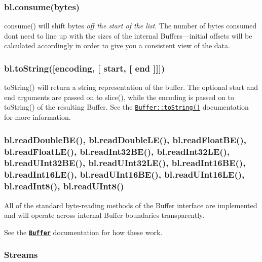  \label{_consume}%
 \subsubsection*{bl.\+consume(bytes)}

{\ttfamily consume()} will shift bytes {\itshape off the start of the list}. The number of bytes consumed don\textquotesingle{}t need to line up with the sizes of the internal Buffers---initial offsets will be calculated accordingly in order to give you a consistent view of the data. 

 \label{_toString}%
 \subsubsection*{bl.\+to\+String(\mbox{[}encoding, \mbox{[} start, \mbox{[} end \mbox{]}\mbox{]}\mbox{]})}

{\ttfamily to\+String()} will return a string representation of the buffer. The optional {\ttfamily start} and {\ttfamily end} arguments are passed on to {\ttfamily slice()}, while the {\ttfamily encoding} is passed on to {\ttfamily to\+String()} of the resulting Buffer. See the \href{http://nodejs.org/docs/latest/api/buffer.html#buffer_buf_tostring_encoding_start_end}{\tt Buffer\+::to\+String()} documentation for more information. 

 \label{_readXX}%
 \subsubsection*{bl.\+read\+Double\+B\+E(), bl.\+read\+Double\+L\+E(), bl.\+read\+Float\+B\+E(), bl.\+read\+Float\+L\+E(), bl.\+read\+Int32\+B\+E(), bl.\+read\+Int32\+L\+E(), bl.\+read\+U\+Int32\+B\+E(), bl.\+read\+U\+Int32\+L\+E(), bl.\+read\+Int16\+B\+E(), bl.\+read\+Int16\+L\+E(), bl.\+read\+U\+Int16\+B\+E(), bl.\+read\+U\+Int16\+L\+E(), bl.\+read\+Int8(), bl.\+read\+U\+Int8()}

All of the standard byte-\/reading methods of the {\ttfamily Buffer} interface are implemented and will operate across internal Buffer boundaries transparently.

See the {\bfseries {\ttfamily \href{http://nodejs.org/docs/latest/api/buffer.html}{\tt Buffer}}} documentation for how these work. 

 \label{_streams}%
 \subsubsection*{Streams}

